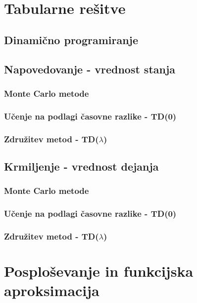 \documentclass[a4paper, oneside, 12pt]{report}
\begin{document}
\chapter{Tabularne rešitve}
\thispagestyle{fancy}
\section{Dinamično programiranje}
\section{Napovedovanje - vrednost stanja}
\subsection{Monte Carlo metode}
\subsection{Učenje na podlagi časovne razlike - TD(0)} \label{subsection:TD0Prediction}
\subsection{Združitev metod - TD($\lambda$)}
\section{Krmiljenje - vrednost dejanja}
\subsection{Monte Carlo metode}
\subsection{Učenje na podlagi časovne razlike - TD(0)} \label{subsection:TD0Control}
\subsection{Združitev metod - TD($\lambda$)}
\newpage

\chapter{Posploševanje in funkcijska aproksimacija}
\thispagestyle{fancy}
\end{document}
